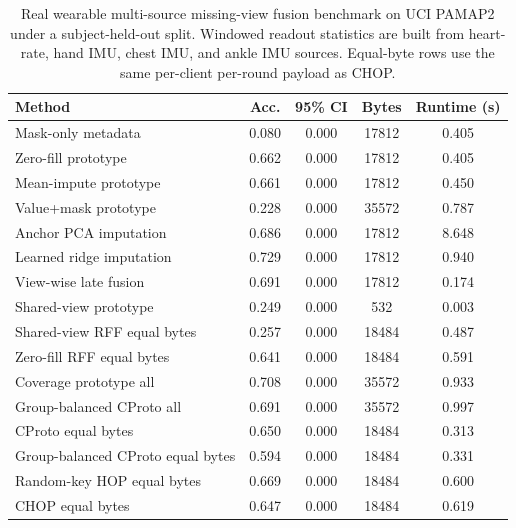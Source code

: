 \begin{table}[t]
\centering
\caption{Real wearable multi-source missing-view fusion benchmark on UCI PAMAP2 under a subject-held-out split. Windowed readout statistics are built from heart-rate, hand IMU, chest IMU, and ankle IMU sources. Equal-byte rows use the same per-client per-round payload as CHOP.}
\label{tab:if-pamap2-fusion}
\scriptsize
\setlength{\tabcolsep}{3pt}
\renewcommand{\arraystretch}{0.94}
\begin{tabular}{lcccc}
\toprule
Method & Acc. & 95\% CI & Bytes & Runtime (s) \\
\midrule
Mask-only metadata & 0.080 & 0.000 & 17812 & 0.405 \\
Zero-fill prototype & 0.662 & 0.000 & 17812 & 0.405 \\
Mean-impute prototype & 0.661 & 0.000 & 17812 & 0.450 \\
Value+mask prototype & 0.228 & 0.000 & 35572 & 0.787 \\
Anchor PCA imputation & 0.686 & 0.000 & 17812 & 8.648 \\
Learned ridge imputation & 0.729 & 0.000 & 17812 & 0.940 \\
View-wise late fusion & 0.691 & 0.000 & 17812 & 0.174 \\
Shared-view prototype & 0.249 & 0.000 & 532 & 0.003 \\
Shared-view RFF equal bytes & 0.257 & 0.000 & 18484 & 0.487 \\
Zero-fill RFF equal bytes & 0.641 & 0.000 & 18484 & 0.591 \\
Coverage prototype all & 0.708 & 0.000 & 35572 & 0.933 \\
Group-balanced CProto all & 0.691 & 0.000 & 35572 & 0.997 \\
CProto equal bytes & 0.650 & 0.000 & 18484 & 0.313 \\
Group-balanced CProto equal bytes & 0.594 & 0.000 & 18484 & 0.331 \\
Random-key HOP equal bytes & 0.669 & 0.000 & 18484 & 0.600 \\
CHOP equal bytes & 0.647 & 0.000 & 18484 & 0.619 \\
\bottomrule
\end{tabular}
\end{table}
